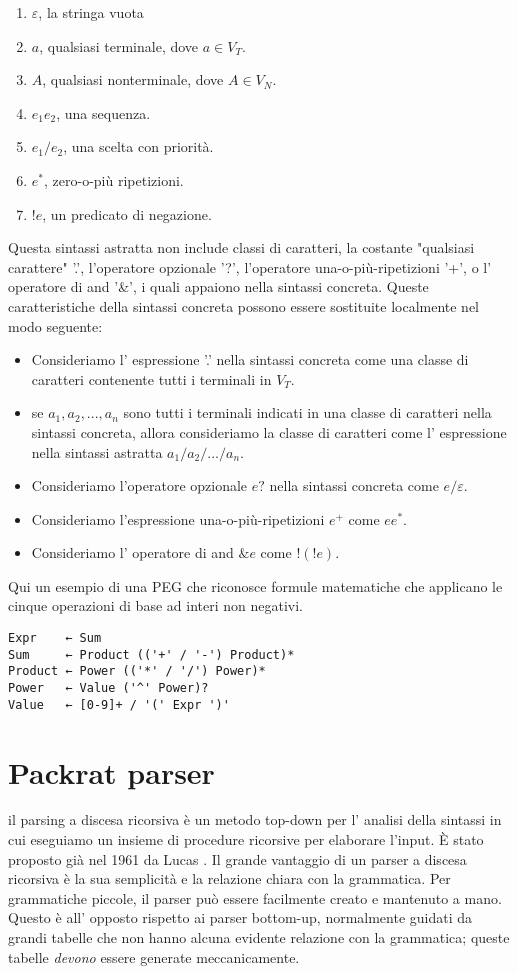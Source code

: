\begin{enumerate}
	\item  $\varepsilon$, la stringa vuota
	\item $a$, qualsiasi terminale, dove $a \in V_T$.
	\item $A$, qualsiasi nonterminale, dove $A \in V_N$.
	\item $e_1 e_2$, una sequenza.
	\item $e_1 / e_2$, una scelta con priorità.
	\item $e^*$, zero-o-più ripetizioni.
	\item $!e$, un predicato di negazione.
\end{enumerate}
Questa sintassi astratta non include classi di caratteri, la costante "qualsiasi carattere" '.', l'operatore opzionale '?', l'operatore una-o-più-ripetizioni '+', o l' operatore di and '\&', i quali appaiono nella sintassi concreta. Queste caratteristiche della sintassi concreta possono essere sostituite localmente nel modo seguente:
\begin{itemize}
\item Consideriamo l' espressione '.' nella sintassi concreta come una classe di caratteri contenente tutti i terminali in $V_T$.
\item se $a_1,a_2,...,a_n$ sono tutti i terminali indicati in una classe di caratteri nella sintassi concreta, allora consideriamo la classe di caratteri come l' espressione nella sintassi astratta $a_1 / a_2 / ... / a_n$.
\item Consideriamo l'operatore opzionale $e?$ nella sintassi concreta come $e/\varepsilon$.
\item Consideriamo l'espressione una-o-più-ripetizioni $e^+$ come $ee^*$.
\item Consideriamo l' operatore di and $\&e$ come $!(!e)$.

\end{itemize}

Qui un esempio di una PEG che riconosce formule matematiche che applicano le cinque operazioni di base ad interi non negativi.
\begin{verbatim}
Expr    ← Sum
Sum     ← Product (('+' / '-') Product)*
Product ← Power (('*' / '/') Power)*
Power   ← Value ('^' Power)?
Value   ← [0-9]+ / '(' Expr ')'
\end{verbatim}

\section{Packrat parser}
il parsing a discesa ricorsiva è un metodo top-down per l' analisi della sintassi in cui eseguiamo un insieme di procedure ricorsive per elaborare l'input. È stato proposto già nel 1961 da Lucas \cite{lucas}. Il grande vantaggio di un parser a discesa ricorsiva è la sua semplicità e la relazione chiara con la grammatica. Per grammatiche piccole, il parser può essere facilmente creato e mantenuto a mano. Questo è all' opposto rispetto ai parser bottom-up, normalmente guidati da grandi tabelle che non hanno alcuna evidente relazione con la grammatica; queste tabelle \textit{devono} essere generate meccanicamente.

